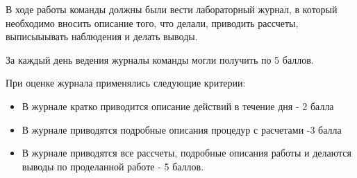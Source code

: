 
В ходе работы команды должны были вести лабораторный журнал, в который необходимо вносить описание того, что делали, приводить рассчеты, выписыыывать наблюдения и делать выводы.

За каждый день ведения журналы команды могли получить по 5 баллов. 

При оценке журнала применялись следующие критерии:
\begin{itemize}
    \item В журнале кратко приводится описание действий в течение дня - 2 балла
    \item В журнале приводятся подробные описания процедур с расчетами -3 балла
    \item В журнале приводятся все рассчеты, подробные описания работы и делаются выводы по проделанной работе - 5 баллов.
\end{itemize}
